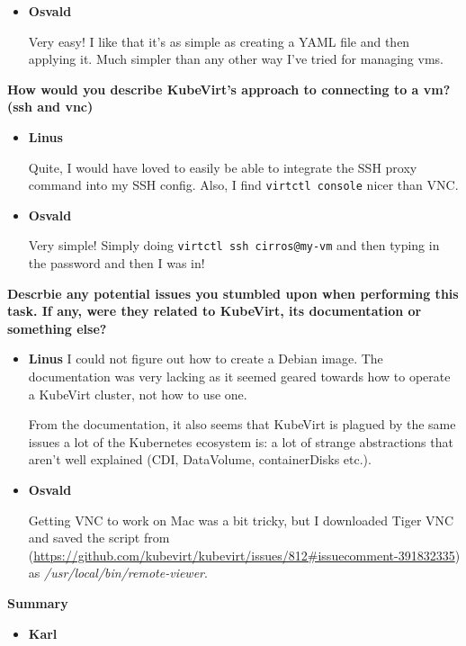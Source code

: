 \documentclass{kththesis}
\begin{document}
\begin{enumerate}
\begin{itemize}
\item \textbf{Osvald}

Very easy! I like that it's as simple as creating a YAML file and then applying it. Much simpler than any other way I've tried for managing \Glspl{vm}.

\end{itemize}

\noindent \textbf{How would you describe KubeVirt's approach to connecting to a \Gls{vm}? (\Gls{ssh} and \Gls{vnc})}
\begin{itemize}

\item \textbf{Linus}

Quite, I would have loved to easily be able to integrate the SSH proxy command into my SSH config.
Also, I find \texttt{virtctl console} nicer than VNC.

\item \textbf{Osvald}

Very simple! Simply doing \texttt{virtctl ssh cirros@my-vm} and then typing in the password and then I was in!
\end{itemize}

\noindent \textbf{Descrbie any potential issues you stumbled upon when performing this task. If any, were they related to KubeVirt, its documentation or something else?}
\begin{itemize}

\item \textbf{Linus}
I could not figure out how to create a Debian image. The documentation was very lacking as it seemed geared towards how to operate a KubeVirt cluster, not how to use one.

From the documentation, it also seems that KubeVirt is plagued by the same issues a lot of the Kubernetes ecosystem is: a lot of strange abstractions that aren't well explained (CDI, DataVolume, containerDisks etc.).

\item \textbf{Osvald}

Getting VNC to work on Mac was a bit tricky, but I downloaded Tiger VNC and saved the script from (\url{https://github.com/kubevirt/kubevirt/issues/812#issuecomment-391832335}) as \textit{/usr/local/bin/remote-viewer}.
\end{itemize}

\noindent \textbf{Summary}
\begin{itemize}
\item \textbf{Karl}
    

\end{itemize}
\end{enumerate}
\end{document}
